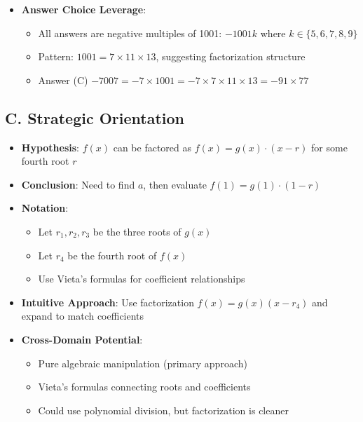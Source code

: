 \documentclass[]{article}
\begin{document}
\begin{problemconfigbox}
\begin{itemize}[leftmargin=*]
    \item \textbf{Answer Choice Leverage}: 
    \begin{itemize}
        \item All answers are negative multiples of 1001: $-1001k$ where $k \in \{5,6,7,8,9\}$
        \item Pattern: $1001 = 7 \times 11 \times 13$, suggesting factorization structure
        \item Answer (C) $-7007 = -7 \times 1001 = -7 \times 7 \times 11 \times 13 = -91 \times 77$
    \end{itemize}
\end{itemize}

\subsection*{C. Strategic Orientation}
\begin{itemize}[leftmargin=*]
    \item \textbf{Hypothesis}: $f(x)$ can be factored as $f(x) = g(x) \cdot (x-r)$ for some fourth root $r$
    
    \item \textbf{Conclusion}: Need to find $a$, then evaluate $f(1) = g(1) \cdot (1-r)$
    
    \item \textbf{Notation}: 
    \begin{itemize}
        \item Let $r_1, r_2, r_3$ be the three roots of $g(x)$
        \item Let $r_4$ be the fourth root of $f(x)$
        \item Use Vieta's formulas for coefficient relationships
    \end{itemize}
    
    \item \textbf{Intuitive Approach}: Use factorization $f(x) = g(x)(x-r_4)$ and expand to match coefficients
    
    \item \textbf{Cross-Domain Potential}: 
    \begin{itemize}
        \item Pure algebraic manipulation (primary approach)
        \item Vieta's formulas connecting roots and coefficients
        \item Could use polynomial division, but factorization is cleaner
    \end{itemize}
\end{itemize}
\end{problemconfigbox}
\end{document}
